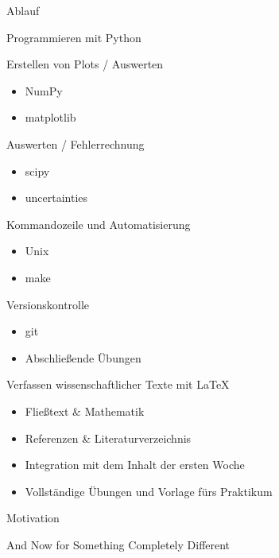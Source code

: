 \begin{frame}{Ablauf}
  \begin{description}
    \item[Montag] Programmieren mit Python
    \item[Dienstag] Erstellen von Plots / Auswerten
      \begin{itemize}
        \item NumPy
        \item matplotlib
      \end{itemize}
    \item[Mittwoch] Auswerten / Fehlerrechnung
      \begin{itemize}
        \item scipy
        \item uncertainties
      \end{itemize}
    \item[Donnerstag] Kommandozeile und Automatisierung
      \begin{itemize}
        \item Unix
        \item make
      \end{itemize}
    \item[Freitag] Versionskontrolle
      \begin{itemize}
        \item git
        \item Abschließende Übungen
      \end{itemize}
    \item[Nächste Woche] Verfassen wissenschaftlicher Texte mit \LaTeX{}
      \begin{itemize}
        \item Fließtext \& Mathematik
        \item Referenzen \& Literaturverzeichnis
        \item Integration mit dem Inhalt der ersten Woche
        \item Vollständige Übungen und Vorlage fürs Praktikum
      \end{itemize}
      
  \end{description}
\end{frame}

\begin{frame}{Motivation}
  \begin{center}
    \textcolor{vertexDarkRed}{\Huge And Now for Something Completely Different}
  \end{center}
\end{frame}

